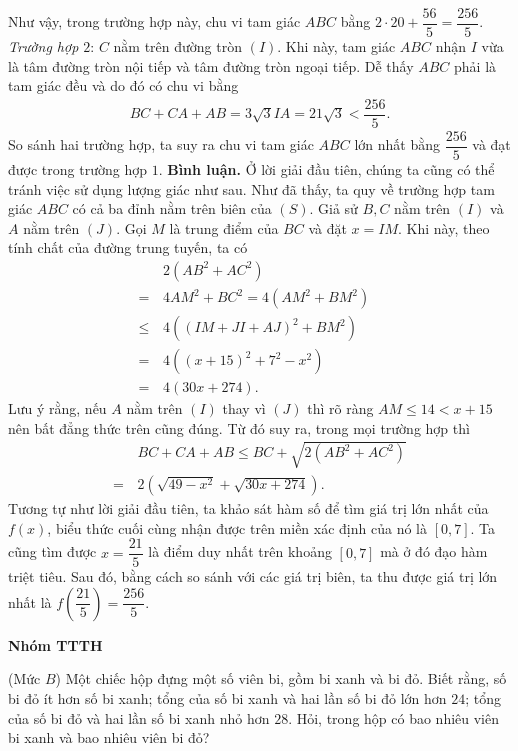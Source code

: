 \begin{multicols}{2}
\vskip 0.05cm
Như vậy, trong trường hợp này, chu vi tam giác $ABC$ bằng $ 2\cdot 20 +    \dfrac{56}{5} = \dfrac{256}{5}$.
\vskip 0.05cm
\textit{Trường hợp $2$}: $C$ nằm trên đường tròn $(I)$. Khi này, tam giác $ABC$ nhận $I$ vừa là tâm đường tròn nội tiếp và tâm đường tròn ngoại tiếp. Dễ thấy $ABC$ phải là tam giác đều và do đó có chu vi bằng
\begin{align*}
	BC+CA+AB = 3\sqrt{3}IA = 21\sqrt{3}	 < \dfrac{256}{5}.
\end{align*}
So sánh hai trường hợp, ta suy ra chu vi tam giác $ABC$ lớn nhất bằng $\dfrac{256}{5}$ và đạt được trong trường hợp $1$.
\vskip 0.05cm
\textbf{\color{thachthuctoanhoc}Bình luận.}
\vskip 0.1cm
Ở lời giải đầu tiên, chúng ta cũng có thể tránh việc sử dụng lượng giác như sau. Như đã thấy, ta quy về trường hợp tam giác $ABC$ có cả ba đỉnh nằm trên biên của $(S)$. Giả sử $B, C$ nằm trên $(I)$ và $A$ nằm trên $(J)$. Gọi $M$ là trung điểm của $BC$ và đặt $x=IM$. Khi này, theo tính chất của đường trung tuyến, ta có
\begin{align*}
	&2(AB^2+AC^2)&\\
	= \,&4AM^2+BC^2= 4(AM^2 + BM^2)\\
	\le\, &4 \left( (IM + JI + AJ)^2 + BM^2\right)\\
	=\,& 4 \left( (x+15)^2 + 7^2-x^2\right)\\
	= \,&4 \left(30x+ 274\right).
\end{align*}
Lưu ý rằng, nếu $A$ nằm trên $(I)$ thay vì $(J)$ thì rõ ràng $AM\le 14< x+15$ nên bất đẳng thức trên cũng đúng. Từ đó suy ra, trong mọi trường hợp thì 
\begin{align*}
	&BC+CA + AB\le BC + \sqrt{2(AB^2+AC^2)}\\
	=\,&2\left(\sqrt{49-x^2} + \sqrt{30x+274}\right).
\end{align*}
Tương tự như lời giải đầu tiên, ta khảo sát hàm số để tìm giá trị lớn nhất của $f(x)$, biểu thức cuối cùng nhận được trên miền xác định của nó là $[0, 7]$. Ta cũng tìm được $x= \dfrac{21}{5}$ là điểm duy nhất trên khoảng $[0, 7]$ mà ở đó đạo hàm triệt tiêu. Sau đó, bằng cách so sánh với các giá trị biên, ta thu được giá trị lớn nhất là $f(\dfrac{21}{5})= \dfrac{256}{5}$. 
	\begin{flushright}
		\textbf{\color{thachthuctoanhoc}Nhóm TTTH}
	\end{flushright}
	{}
	(Mức $B$) Một chiếc hộp đựng một số viên bi, gồm bi xanh và bi đỏ. Biết rằng, số bi đỏ ít hơn số bi xanh; tổng của số bi xanh và hai lần số bi đỏ lớn hơn $24$; tổng của số bi đỏ và hai lần số bi xanh nhỏ hơn $28$. Hỏi, trong hộp có bao nhiêu viên bi xanh và bao nhiêu viên bi đỏ?

\end{multicols}
